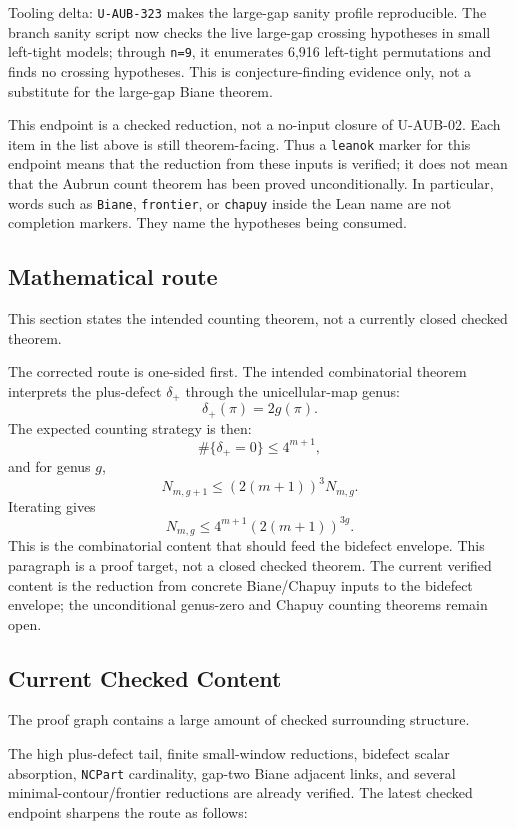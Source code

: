 \documentclass[
]{article}
\begin{document}
Tooling delta: \texttt{U-AUB-323} makes the large-gap sanity profile
reproducible. The branch sanity script now checks the live large-gap
crossing hypotheses in small left-tight models; through \texttt{n=9}, it
enumerates 6,916 left-tight permutations and finds no crossing
hypotheses. This is conjecture-finding evidence only, not a substitute
for the large-gap Biane theorem.

This endpoint is a checked reduction, not a no-input closure of
U-AUB-02. Each item in the list above is still theorem-facing. Thus a
\texttt{leanok} marker for this endpoint means that the reduction from
these inputs is verified; it does not mean that the Aubrun count theorem
has been proved unconditionally. In particular, words such as
\texttt{Biane}, \texttt{frontier}, or \texttt{chapuy} inside the Lean
name are not completion markers. They name the hypotheses being
consumed.

\subsection{Mathematical route}\label{mathematical-route}

This section states the intended counting theorem, not a currently
closed checked theorem.

The corrected route is one-sided first. The intended combinatorial
theorem interprets the plus-defect \(\delta_+\) through the
unicellular-map genus: \[
  \delta_+(\pi) = 2g(\pi).
\] The expected counting strategy is then: \[
  \#\{\delta_+=0\} \le 4^{m+1},
\] and for genus \(g\), \[
  N_{m,g+1}
  \le (2(m+1))^3 N_{m,g}.
\] Iterating gives \[
  N_{m,g} \le 4^{m+1}(2(m+1))^{3g}.
\] This is the combinatorial content that should feed the bidefect
envelope. This paragraph is a proof target, not a closed checked
theorem. The current verified content is the reduction from concrete
Biane/Chapuy inputs to the bidefect envelope; the unconditional
genus-zero and Chapuy counting theorems remain open.

\subsection{Current Checked Content}\label{current-checked-content}

The proof graph contains a large amount of checked surrounding
structure.

The high plus-defect tail, finite small-window reductions, bidefect
scalar absorption, \texttt{NCPart} cardinality, gap-two Biane adjacent
links, and several minimal-contour/frontier reductions are already
verified. The latest checked endpoint sharpens the route as follows:
\end{document}

